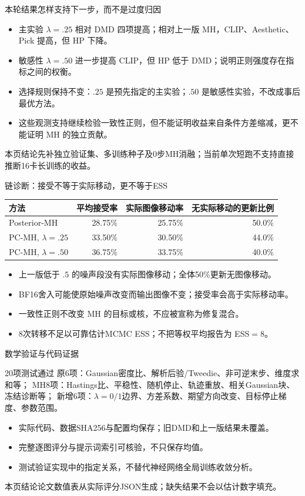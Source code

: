 \documentclass[10pt,aspectratio=169]{beamer}
\newcommand{\takeaway}[1]{\begin{exampleblock}{本页结论}\small #1\end{exampleblock}}
\begin{document}
\begin{frame}{本轮结果怎样支持下一步，而不是过度归因}
\small
\begin{itemize}\itemsep6pt
\item 主实验 $\lambda=.25$ 相对 DMD 四项提高；相对上一版 MH，CLIP、Aesthetic、Pick 提高，但 HP 下降。
\item 敏感性 $\lambda=.50$ 进一步提高 CLIP，但 HP 低于 DMD；说明正则强度存在指标之间的权衡。
\item 选择规则保持不变：$.25$ 是预先指定的主实验；$.50$ 是敏感性实验，不改成事后最优方法。
\item 这些观测支持继续检验一致性正则，但不能证明收益来自条件方差缩减，更不能证明 MH 的独立贡献。
\end{itemize}
\takeaway{先补独立验证集、多训练种子及0步MH消融；当前单次短跑不支持直接推断16卡长训练的收益。}
\end{frame}

\begin{frame}{链诊断：接受不等于实际移动，更不等于ESS}
\small
\begin{center}
\begin{tabular}{lrrr}\toprule
方法 & 平均接受率 & 实际图像移动率 & 无实际移动的更新比例\\\midrule
Posterior-MH & 28.75\% & 25.75\% & 50.0\% \\
PC-MH, $\lambda=.25$ & 33.50\% & 30.50\% & 44.0\% \\
PC-MH, $\lambda=.50$ & 36.75\% & 33.75\% & 40.0\% \\
\bottomrule
\end{tabular}
\end{center}
\begin{itemize}\itemsep4pt
\item 上一版低于 $.5$ 的噪声段没有实际图像移动；全体50\%更新无图像移动。
\item BF16舍入可能使原始噪声改变而输出图像不变；接受率会高于实际移动率。
\item 一致性正则不改变 MH 的目标或核，不应被宣称为修复混合。
\item 8次转移不足以可靠估计MCMC ESS；不把等权平均报告为 ESS$=8$。
\end{itemize}
\end{frame}

\begin{frame}{数学验证与代码证据}
\small
\begin{block}{20项测试通过}
原6项：Gaussian密度比、解析后验/Tweedie、非可逆末步、维度求和等；
MH8项：Hastings比、平稳性、随机停止、轨迹重放、相关Gaussian块、冻结诊断等；
新增6项：$\lambda=0/1$边界、方差系数、期望方向改变、目标停止梯度、参数范围。
\end{block}
\begin{itemize}\itemsep4pt
\item 实际代码、数据SHA256与配置均保存；旧DMD和上一版结果未覆盖。
\item 完整逐图评分与提示词索引可核验，不只保存均值。
\item 测试验证实现中的指定关系，不替代神经网络全局训练收敛分析。
\end{itemize}
\takeaway{论文数值表从实际评分JSON生成；缺失结果不会以估计数字填充。}
\end{frame}
\end{document}
